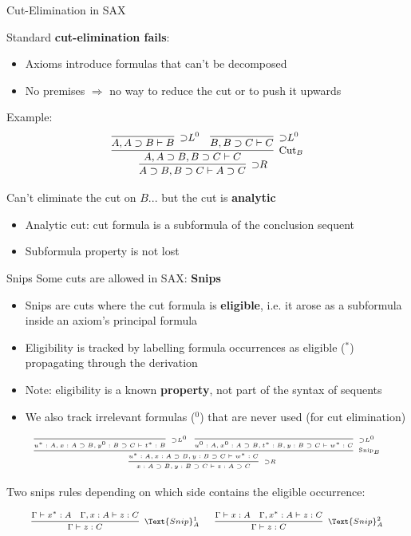 \documentclass[9ps]{beamer}
\begin{document}
\begin{frame}{Cut-Elimination in SAX}
\small

Standard \textbf{cut-elimination fails}:
\begin{itemize}
  \item Axioms introduce formulas that can't be decomposed 
  \item No premises $\Rightarrow$ no way to reduce the cut or to push it upwards
\end{itemize}

\bigskip

Example:
\[\small
  \infer[{\supset}R]{A \supset B, B \supset C \vdash A \supset C}{
    \infer[\text{Cut}_B]{A, A \supset B, B \supset C \vdash C}{
      \infer[{\supset}L^0]{A, A \supset B \vdash B}{} &
      \infer[{\supset}L^0]{B, B \supset C \vdash C}{}
    }
  }
\]

\medskip

Can't eliminate the cut on $B$... but the cut is \textbf{analytic}
\begin{itemize}
  \item Analytic cut: cut formula is a subformula of the conclusion sequent 
  \item Subformula property is not lost
\end{itemize}
\end{frame}

\begin{frame}{Snips}
\footnotesize
Some cuts are allowed in SAX: \textbf{Snips}
\begin{itemize}
  \item Snips are cuts where the cut formula is \textbf{eligible}, i.e. it arose
    as a subformula inside an axiom's principal formula
  \item Eligibility is tracked by labelling formula occurrences as eligible
    ($^*$) propagating through the derivation  
  \item Note: eligibility is a known \textbf{property}, not part of the syntax
    of sequents
  \item We also track irrelevant formulas ($^0$) that are never used (for cut
    elimination)
\end{itemize}
\[\tiny
  \infer[{\supset}R]{x:A \supset B, y:B \supset C \vdash z:A \supset C}{
    \infer[\text{Snip}_B]{u^*:A, x:A \supset B, y:B \supset C \vdash w^*:C}{
      \infer[{\supset}L^0]{u^*:A, x:A \supset B, y^0:B \supset C \vdash t^*:B}{} &
      \infer[{\supset}L^0]{u^0:A, x^0:A \supset B, t^*:B, y:B \supset C \vdash w^*:C}{}
    }
  }
\]

Two snips rules depending on which side contains the eligible occurrence:

\[\scriptsize
  \infer[\Text{Snip}_A^1]{\Gamma \vdash z : C}{
    \Gamma \vdash x^* : A &
    \Gamma, x : A \vdash z : C
  }
  \;\;\;\;\;
  \infer[\Text{Snip}_A^2]{\Gamma \vdash z : C}{
    \Gamma \vdash x : A &
    \Gamma, x^* : A \vdash z : C
  }
\]
\end{frame}
\end{document}
